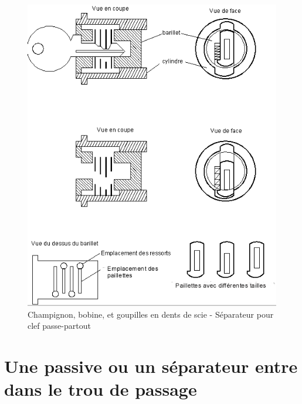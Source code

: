 \documentclass[a4paper,french,11pt,twoside]{report}
\begin{document}

\begin{figure}[h] \begin{center}
        \includegraphics[scale=0.6]{images/Image26}
        \caption{Champignon, bobine, et goupilles en dents de scie - Séparateur pour clef passe-partout}
\end{center} \end{figure}


\section{Une passive ou un séparateur entre dans le trou de passage}
\end{document}
